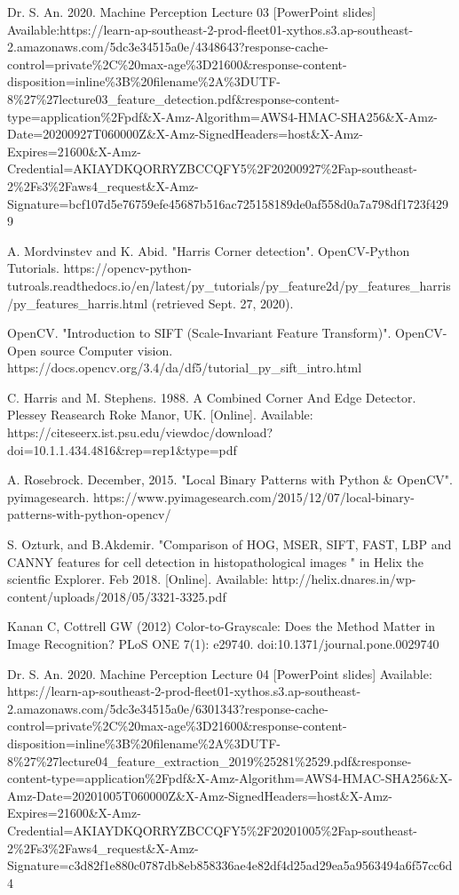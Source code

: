 \documentclass[conference]{IEEEtran}
\begin{document}
\newpage
\clearpage
\begin{thebibliography}{00}

 Dr. S. An. 2020. Machine Perception Lecture 03 [PowerPoint slides] Available:https://learn-ap-southeast-2-prod-fleet01-xythos.s3.ap-southeast-2.amazonaws.com/5dc3e34515a0e/4348643?response-cache-control=private\%2C\%20max-age\%3D21600\&response-content-disposition=inline\%3B\%20filename\%2A\%3DUTF-8\%27\%27lecture03\_feature\_detection.pdf\&response-content-type=application\%2Fpdf\&X-Amz-Algorithm=AWS4-HMAC-SHA256\&X-Amz-Date=20200927T060000Z\&X-Amz-SignedHeaders=host\&X-Amz-Expires=21600\&X-Amz-Credential=AKIAYDKQORRYZBCCQFY5\%2F20200927\%2Fap-southeast-2\%2Fs3\%2Faws4\_request\&X-Amz-Signature=bcf107d5e76759efe45687b516ac725158189de0af558d0a7a798df1723f4299

A. Mordvinstev and K. Abid. "Harris Corner detection". OpenCV-Python Tutorials. https://opencv-python-tutroals.readthedocs.io/en/latest/py\_tutorials/py\_feature2d/py\_features\_harris/py\_features\_harris.html (retrieved Sept. 27, 2020).

OpenCV. "Introduction to SIFT (Scale-Invariant Feature Transform)". OpenCV-Open source Computer vision. https://docs.opencv.org/3.4/da/df5/tutorial\_py\_sift\_intro.html

C. Harris and M. Stephens. 1988. A Combined Corner And Edge Detector. Plessey Reasearch Roke Manor, UK. [Online]. Available: https://citeseerx.ist.psu.edu/viewdoc/download?doi=10.1.1.434.4816\&rep=rep1\&type=pdf

A. Rosebrock. December, 2015. "Local Binary Patterns with Python \& OpenCV". pyimagesearch. https://www.pyimagesearch.com/2015/12/07/local-binary-patterns-with-python-opencv/

 S. Ozturk, and B.Akdemir. "Comparison of HOG, MSER, SIFT, FAST, LBP and CANNY features for cell detection in histopathological images " in Helix the scientfic Explorer. Feb 2018. [Online]. Available: http://helix.dnares.in/wp-content/uploads/2018/05/3321-3325.pdf

 Kanan C, Cottrell GW (2012) Color-to-Grayscale: Does the Method Matter in Image Recognition? PLoS ONE 7(1): e29740. doi:10.1371/journal.pone.0029740

 Dr. S. An. 2020. Machine Perception Lecture 04 [PowerPoint slides] Available: https://learn-ap-southeast-2-prod-fleet01-xythos.s3.ap-southeast-2.amazonaws.com/5dc3e34515a0e/6301343?response-cache-control=private\%2C\%20max-age\%3D21600\&response-content-disposition=inline\%3B\%20filename\%2A\%3DUTF-8\%27\%27lecture04\_feature\_extraction\_2019\%25281\%2529.pdf\&response-content-type=application\%2Fpdf\&X-Amz-Algorithm=AWS4-HMAC-SHA256\&X-Amz-Date=20201005T060000Z\&X-Amz-SignedHeaders=host\&X-Amz-Expires=21600\&X-Amz-Credential=AKIAYDKQORRYZBCCQFY5\%2F20201005\%2Fap-southeast-2\%2Fs3\%2Faws4\_request\&X-Amz-Signature=c3d82f1e880c0787db8eb858336ae4e82df4d25ad29ea5a9563494a6f57cc6d4



\end{thebibliography}
\end{document}
